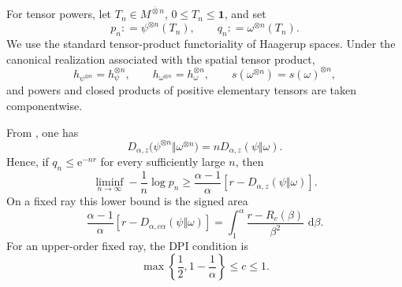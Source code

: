 \documentclass[12pt]{article}
\numberwithin{equation}{section}
\theoremstyle{definition}
\theoremstyle{remark}
\newcommand{\one}{\mathbf 1}
\newcommand{\dd}{\,\mathrm d}
\newcommand{\?}{\overset{?}{=}}
\newcommand{\defeq}{\mathrel{\mathop:}=}
\newcommand{\e}{\epsilon}
\renewcommand{\e}{\mathrm e}
\begin{document}
For tensor powers, let
\(T_n\in M^{\bar\otimes n}\), \(0\leq T_n\leq\one\), and set
\[
  p_n\defeq\psi^{\otimes n}(T_n),
  \qquad
  q_n\defeq\omega^{\otimes n}(T_n).
\]
We use the standard tensor-product functoriality of Haagerup spaces.
Under the canonical realization associated with the spatial tensor product,
\begin{equation}
  h_{\psi^{\otimes n}}=h_\psi^{\otimes n},
  \qquad
  h_{\omega^{\otimes n}}=h_\omega^{\otimes n},
  \qquad
  s(\omega^{\otimes n})=s(\omega)^{\otimes n},
  \label{eq:tensor-haagerup-densities}
\end{equation}
and powers and closed products of positive elementary tensors are taken
componentwise.

From \cite[Proposition 10]{Kato:2023hlj}, one has
\begin{equation}
  D_{\alpha,z}
  \bigl(\psi^{\otimes n}\Vert\omega^{\otimes n}\bigr)
  =
  nD_{\alpha,z}(\psi\Vert\omega).
  \label{eq:tensor-alpha-z-additivity}
\end{equation}
Hence, if
$q_n\leq\e^{-nr}$ for every sufficiently large $n$, then
\begin{equation}
  \liminf_{n\to\infty}-\frac1n\log p_n
  \geq\frac{\alpha-1}{\alpha}
       \left[r-D_{\alpha,z}(\psi\Vert\omega)\right].
  \label{eq:iid-testing-converse}
\end{equation}
On a fixed ray this lower bound is the signed area
\begin{equation}
  \frac{\alpha-1}{\alpha}
  \left[r-D_{\alpha,c\alpha}(\psi\Vert\omega)\right]
  =\int_1^\alpha
   \frac{r-R_c(\beta)}{\beta^2}\,\dd\beta.
  \label{eq:generic-testing-area}
\end{equation}
For an upper-order fixed ray, the DPI condition is
\begin{equation}
  \max\!\left\{\frac12,1-\frac1\alpha\right\}
  \leq c\leq1.
  \label{eq:fixed-ray-dpi}
\end{equation}
\end{document}
